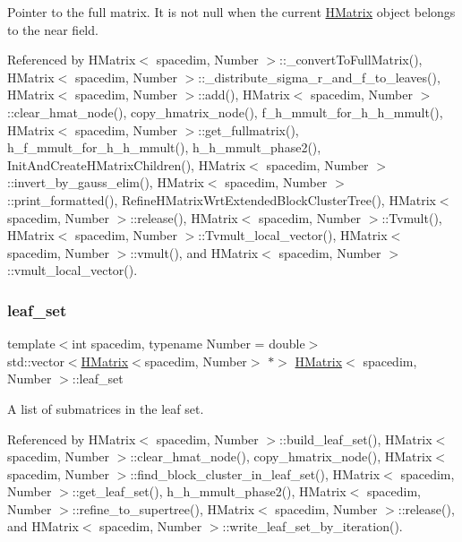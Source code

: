 Pointer to the full matrix. It is not null when the current \hyperlink{classHMatrix}{H\+Matrix} object belongs to the near field. 

Referenced by H\+Matrix$<$ spacedim, Number $>$\+::\+\_\+convert\+To\+Full\+Matrix(), H\+Matrix$<$ spacedim, Number $>$\+::\+\_\+distribute\+\_\+sigma\+\_\+r\+\_\+and\+\_\+f\+\_\+to\+\_\+leaves(), H\+Matrix$<$ spacedim, Number $>$\+::add(), H\+Matrix$<$ spacedim, Number $>$\+::clear\+\_\+hmat\+\_\+node(), copy\+\_\+hmatrix\+\_\+node(), f\+\_\+h\+\_\+mmult\+\_\+for\+\_\+h\+\_\+h\+\_\+mmult(), H\+Matrix$<$ spacedim, Number $>$\+::get\+\_\+fullmatrix(), h\+\_\+f\+\_\+mmult\+\_\+for\+\_\+h\+\_\+h\+\_\+mmult(), h\+\_\+h\+\_\+mmult\+\_\+phase2(), Init\+And\+Create\+H\+Matrix\+Children(), H\+Matrix$<$ spacedim, Number $>$\+::invert\+\_\+by\+\_\+gauss\+\_\+elim(), H\+Matrix$<$ spacedim, Number $>$\+::print\+\_\+formatted(), Refine\+H\+Matrix\+Wrt\+Extended\+Block\+Cluster\+Tree(), H\+Matrix$<$ spacedim, Number $>$\+::release(), H\+Matrix$<$ spacedim, Number $>$\+::\+Tvmult(), H\+Matrix$<$ spacedim, Number $>$\+::\+Tvmult\+\_\+local\+\_\+vector(), H\+Matrix$<$ spacedim, Number $>$\+::vmult(), and H\+Matrix$<$ spacedim, Number $>$\+::vmult\+\_\+local\+\_\+vector().

\mbox{\label{classHMatrix_a61dbd471077be0ad8325d0f2afe3d43f}} 
\subsubsection{\texorpdfstring{leaf\+\_\+set}{leaf\_set}}
{\footnotesize\ttfamily template$<$int spacedim, typename Number = double$>$ \\
std\+::vector$<$\hyperlink{classHMatrix}{H\+Matrix}$<$spacedim, Number$>$ $\ast$$>$ \hyperlink{classHMatrix}{H\+Matrix}$<$ spacedim, Number $>$\+::leaf\+\_\+set\hspace{0.3cm}{\ttfamily [private]}}

A list of submatrices in the leaf set. 

Referenced by H\+Matrix$<$ spacedim, Number $>$\+::build\+\_\+leaf\+\_\+set(), H\+Matrix$<$ spacedim, Number $>$\+::clear\+\_\+hmat\+\_\+node(), copy\+\_\+hmatrix\+\_\+node(), H\+Matrix$<$ spacedim, Number $>$\+::find\+\_\+block\+\_\+cluster\+\_\+in\+\_\+leaf\+\_\+set(), H\+Matrix$<$ spacedim, Number $>$\+::get\+\_\+leaf\+\_\+set(), h\+\_\+h\+\_\+mmult\+\_\+phase2(), H\+Matrix$<$ spacedim, Number $>$\+::refine\+\_\+to\+\_\+supertree(), H\+Matrix$<$ spacedim, Number $>$\+::release(), and H\+Matrix$<$ spacedim, Number $>$\+::write\+\_\+leaf\+\_\+set\+\_\+by\+\_\+iteration().


